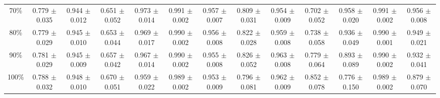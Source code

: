 \documentclass[11pt]{article}
\begin{document}
\begin{table}[ht]
{\begin{tabular}{ccccccccccccc}
70\% & 0.779 $\pm$ 0.035 & 0.944 $\pm$ 0.012 & 0.651 $\pm$ 0.052 & 0.973 $\pm$ 0.014 & 0.991 $\pm$ 0.002 & 0.957 $\pm$ 0.007 & 0.809 $\pm$ 0.031 & 0.954 $\pm$ 0.009 & 0.702 $\pm$ 0.052 & 0.958 $\pm$ 0.020 & 0.991 $\pm$ 0.002 & 0.956 $\pm$ 0.008 \\
80\% & 0.779 $\pm$ 0.029 & 0.945 $\pm$ 0.010 & 0.653 $\pm$ 0.044 & 0.969 $\pm$ 0.017 & 0.990 $\pm$ 0.002 & 0.956 $\pm$ 0.008 & 0.822 $\pm$ 0.028 & 0.959 $\pm$ 0.008 & 0.738 $\pm$ 0.058 & 0.936 $\pm$ 0.049 & 0.990 $\pm$ 0.001 & 0.949 $\pm$ 0.021 \\
90\% & 0.781 $\pm$ 0.029 & 0.945 $\pm$ 0.009 & 0.657 $\pm$ 0.042 & 0.967 $\pm$ 0.014 & 0.990 $\pm$ 0.002 & 0.955 $\pm$ 0.008 & 0.826 $\pm$ 0.052 & 0.963 $\pm$ 0.008 & 0.779 $\pm$ 0.064 & 0.893 $\pm$ 0.089 & 0.990 $\pm$ 0.002 & 0.932 $\pm$ 0.041 \\
100\% & 0.788 $\pm$ 0.032 & 0.948 $\pm$ 0.010 & 0.670 $\pm$ 0.051 & 0.959 $\pm$ 0.022 & 0.989 $\pm$ 0.002 & 0.953 $\pm$ 0.009 & 0.796 $\pm$ 0.081 & 0.962 $\pm$ 0.009 & 0.852 $\pm$ 0.078 & 0.776 $\pm$ 0.150 & 0.989 $\pm$ 0.002 & 0.879 $\pm$ 0.070 \\
\bottomrule
\end{tabular}
}
\end{table}

\clearpage
\end{document}
